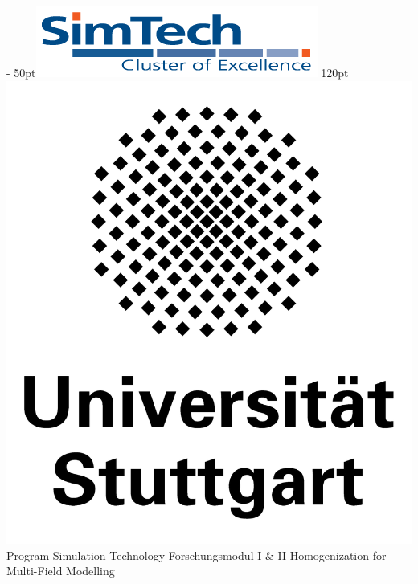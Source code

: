 \documentclass[paper=a4, fontsize=11pt]{scrartcl}
\begin{document}
% 
\begin{titlePageST}
\makeLogo%
{- 50pt}{\includegraphics[scale=0.3]{pics/_simtech.png}}%
{ 120pt}{\includegraphics[scale=0.8]{pics/_unilogo.png}}%
\vspace{35pt}%
\vspace{50pt}%
\makeTitle%
{Program Simulation Technology } %
{Forschungsmodul I \& II}
\vspace{80pt}%
\makeTitleThesis%
{Homogenization for Multi-Field Modelling} %
\vspace{100pt}%

\end{titlePageST}
\end{document}
